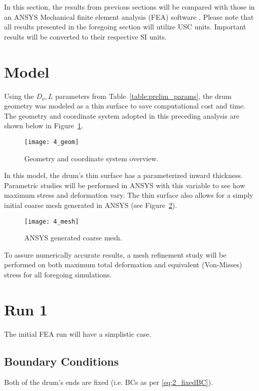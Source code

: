 In this section, the results from previous sections will be compared with those in an ANSYS Mechanical finite element analysis (FEA) software \cite{ANSYS}. Please note that all results presented in the foregoing section will utilize USC units. Important results will be converted to their respective SI units.

\section{Model}

Using the $D_o , L$ parameters from Table~\ref{table:prelim_params}, the drum geometry was modeled as a thin surface to save computational cost and time. The geometry and coordinate system adopted in this preceding analysis are shown below in Figure~\ref{fig:4_geom}.

\begin{figure}[H]
	\centering
	\texttt{[image: 4\_geom]}
	\caption{Geometry and coordinate system overview.}
	\label{fig:4_geom}
\end{figure}

In this model, the drum's thin surface has a parameterized inward thickness. Parametric studies will be performed in ANSYS with this variable to see how maximum stress and deformation vary. The thin surface also allows for a simply initial coarse mesh generated in ANSYS (see Figure~\ref{fig:4_mesh}).

\begin{figure}[H]
	\centering
	\texttt{[image: 4\_mesh]}
	\caption{ANSYS generated coarse mesh.}
	\label{fig:4_mesh}
\end{figure}

To assure numerically accurate results, a mesh refinement study will be performed on both maximum total deformation and equivalent (Von-Misses) stress for all foregoing simulations.



\section{Run 1}

The initial FEA run will have a simplistic case. 

\subsection{Boundary Conditions}

Both of the drum's ends are fixed (i.e. BCs as per \ref{eq:2_fixedBC}).\\

